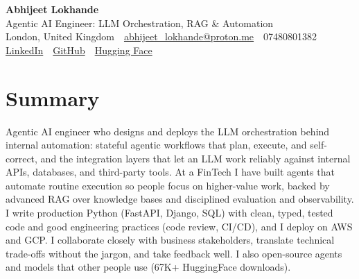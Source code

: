 \documentclass[10pt,a4paper]{article}
\newcommand{\sep}{\,\textcolor{accent!60}{\textbar}\,}
\begin{document}
\begin{center}
  {\fontsize{24}{26}\selectfont\bfseries Abhijeet Lokhande}\\[3pt]
  {\color{accent}\large Agentic AI Engineer: LLM Orchestration, RAG \& Automation}\\[5pt]
  {\small
    London, United Kingdom \sep
    \href{mailto:abhijeet_lokhande@proton.me}{abhijeet\_lokhande@proton.me} \sep
    07480801382 \\[2pt]
    \href{https://www.linkedin.com/in/ablds/}{LinkedIn} \sep
    \href{https://github.com/abhijeetscode}{GitHub} \sep
    \href{https://huggingface.co/ab-ai}{Hugging Face}
  }
\end{center}
\vspace{2pt}

\section{Summary}
Agentic AI engineer who designs and deploys the LLM orchestration behind internal automation: stateful agentic workflows that plan, execute, and self-correct, and the integration layers that let an LLM work reliably against internal APIs, databases, and third-party tools. At a FinTech I have built agents that automate routine execution so people focus on higher-value work, backed by advanced RAG over knowledge bases and disciplined evaluation and observability. I write production Python (FastAPI, Django, SQL) with clean, typed, tested code and good engineering practices (code review, CI/CD), and I deploy on AWS and GCP. I collaborate closely with business stakeholders, translate technical trade-offs without the jargon, and take feedback well. I also open-source agents and models that other people use (67K+ HuggingFace downloads).

\end{document}
